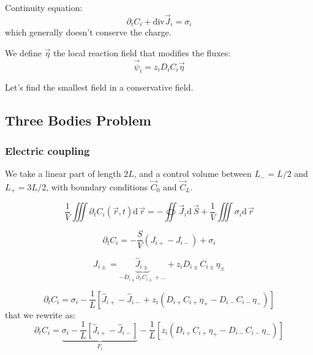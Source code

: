 \documentclass[aps,12pt]{revtex4}
\begin{document}
Continuity equation:
\begin{equation}
	\partial_t C_i + \mathrm{div} \vec{J}_i = \sigma_i
\end{equation}
which generally doesn't conserve the charge.

We define $\vec \eta$ the local reaction field that modifies the fluxes:
\begin{equation}
	\vec \psi_i = z_i D_i C_i \vec \eta
\end{equation}

Let's find the smallest field in a conservative field.

\subsection{Three Bodies Problem}

\subsubsection{Electric coupling}
We take a linear part of length $2L$, and a control volume between $L_-=L/2$ and $L_+=3L/2$,
with boundary conditions $\vec C_0$ and $\vec C_L$.

\begin{equation}
	\dfrac{1}{V} \iiint \partial_t C_i(\vec r,t)  \mathrm{d}\, \vec r
	= - \oiint  	\vec{J}_i \mathrm{d}\, \vec S + \dfrac{1}{V} \iiint \sigma_i \mathrm{d}\, \vec r
\end{equation}
 
\begin{equation}
	\partial_t C_i = -\dfrac{S}{V}(J_{i+}-J_{i-}) + \sigma_i
\end{equation}

\begin{equation}
	J_{i\pm} = \underbrace{\hat J_{i\pm}}_{-D_{i\pm} \partial_x C_{i\pm}+\ldots} + z_i D_{i\pm} C_{i\pm} \eta_\pm
\end{equation}

\begin{equation}
	\partial_t C_i = \sigma_i -\dfrac{1}{L} \left[ \hat J_{i+}- \hat J_{i-} + z_i (D_{i+} C_{i+} \eta_+ - D_{i-}C_{i-} \eta_-) \right] 
\end{equation}
that we rewrite as:
\begin{equation}
	\partial_t C_i =
	 \underbrace{\sigma_i -\dfrac{1}{L} \left[ \hat J_{i+}- \hat J_{i-} \right]}_{F_i} 
	 - \dfrac{1}{L}  \left[ z_i (D_{i+} C_{i+} \eta_+ - D_{i-}C_{i-} \eta_-)\right] 
\end{equation}
\end{document}
